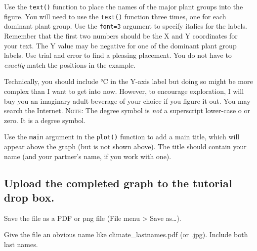 \documentclass[11pt]{article}
\begin{document}
	Use the \texttt{text()} function to place the names of the major plant groups
	into the figure. You will need to use the \texttt{text()} function
	three times, one for each dominant plant group. Use the \texttt{font=3}
	argument to specify italics for the labels. Remember that the first two
	numbers should be the X and Y coordinates for your text. The Y value may
	be negative for one of the dominant plant group labels. Use trial and error to find a pleasing placement. You do not have to \emph{exactly} match the positions in the example.
	
	Technically, you should include °C in the Y-axis label but doing so might be
	more complex than I want to get into now. However, to encourage
	exploration, I will buy you an imaginary adult beverage of your choice if %
	you figure it out. You may search the Internet. \textsc{Note:} The degree symbol is \emph{not} a superscript lower-case o or zero. It is a degree symbol.
	
	Use the \texttt{main} argument in the \texttt{plot()} function to add
	a main title, which will appear above the graph (but is not shown
	above). The title should contain your name (and your partner's name, if you work with one).
	
	
	\subsection*{Upload the completed graph to the tutorial drop box.}
	
	Save the file as a PDF or png file (File menu \textgreater{} Save
	as\ldots{}).
	
	Give the file an obvious name like climate\_lastnames.pdf (or .jpg).
	Include both last names. 
	
\end{document}
